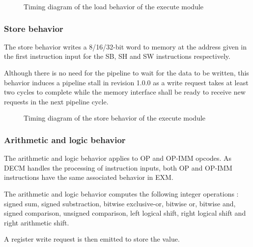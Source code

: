 \begin{figure}[H]
    \centering
    
    \caption{Timing diagram of the load behavior of the execute module}
    \label{fig:exm-behavior-load}
\end{figure}



\subsubsection{Store behavior}

\begin{content}
    The store behavior writes a 8/16/32-bit word to memory at the address given in the first instruction input for the SB, SH and SW instructions respectively.

    Although there is no need for the pipeline to wait for the data to be written, this behavior induces a pipeline stall in revision 1.0.0 as a write request takes at least two cycles to complete while the memory interface shall be ready to receive new requests in the next pipeline cycle.
\end{content}

\begin{figure}[H]
    \centering
    
    \caption{Timing diagram of the store behavior of the execute module}
    \label{fig:exm-behavior-store}
\end{figure}



\subsubsection{Arithmetic and logic behavior}

\begin{content}
  The arithmetic and logic behavior applies to OP and OP-IMM opcodes. As DECM handles the processing of instruction inputs, both OP and OP-IMM instructions have the same associated behavior in EXM.

  The arithmetic and logic behavior computes the following integer operations : signed sum, signed substraction, bitwise exclusive-or, bitwise or, bitwise and, signed comparison, unsigned comparison, left logical shift, right logical shift and right arithmetic shift.
  
  A register write request is then emitted to store the value.
\end{content}

